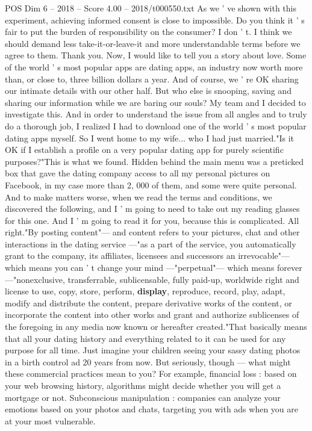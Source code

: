 \begin{textsample}{POS Dim 6 – 2018 – Score 4.00 – 2018/t000550.txt}
As we ' ve shown with this experiment, achieving informed consent is close to impossible.
Do you think it ' s fair to put the burden of responsibility on the consumer?
I don ' t.
I think we should demand less take-it-or-leave-it and more understandable terms before we agree to them.
Thank you.
Now, I would like to tell you a story about love.
Some of the world ' s most popular apps are dating apps, an industry now worth more than, or close to, three billion dollars a year.
And of course, we ' re OK sharing our intimate details with our other half.
But who else is snooping, saving and sharing our information while we are baring our souls?
My team and I decided to investigate this.
And in order to understand the issue from all angles and to truly do a thorough job, I realized I had to download one of the world ' s most popular dating apps myself.
So I went home to my wife... who I had just married."Is it OK if I establish a profile on a very popular dating app for purely scientific purposes?"This is what we found.
Hidden behind the main menu was a preticked box that gave the dating company access to all my personal pictures on Facebook, in my case more than 2, 000 of them, and some were quite personal.
And to make matters worse, when we read the terms and conditions, we discovered the following, and I ' m going to need to take out my reading glasses for this one.
And I ' m going to read it for you, because this is complicated.
All right."By posting content"— and content refers to your pictures, chat and other interactions in the dating service —"as a part of the service, you automatically grant to the company, its affiliates, licensees and successors an irrevocable"— which means you can ' t change your mind —"perpetual"— which means forever —"nonexclusive, transferrable, sublicensable, fully paid-up, worldwide right and license to use, copy, store, perform, \textbf{display}, reproduce, record, play, adapt, modify and distribute the content, prepare derivative works of the content, or incorporate the content into other works and grant and authorize sublicenses of the foregoing in any media now known or hereafter created."That basically means that all your dating history and everything related to it can be used for any purpose for all time.
Just imagine your children seeing your sassy dating photos in a birth control ad 20 years from now.
But seriously, though — what might these commercial practices mean to you?
For example, financial loss : based on your web browsing history, algorithms might decide whether you will get a mortgage or not.
Subconscious manipulation : companies can analyze your emotions based on your photos and chats, targeting you with ads when you are at your most vulnerable.

\end{textsample}
